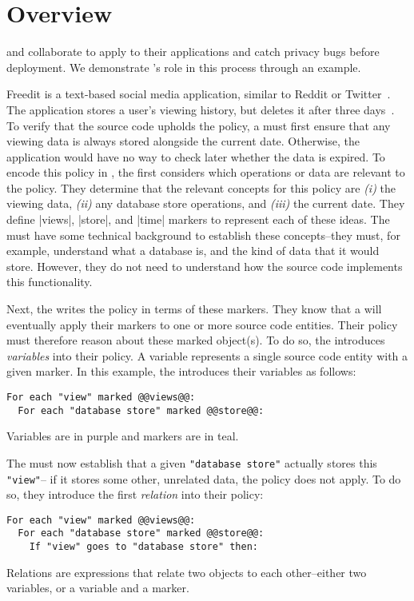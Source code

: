 \chapter{Overview}
\label{sec:overview}

\Ces{} and \devs{} collaborate to apply \sys{} to their applications and catch privacy bugs before deployment.
%
We demonstrate \syslang's role in this process through an example.

Freedit is a text-based social media application, similar to Reddit or Twitter~\cite{freedit}.
%
The application stores a user's viewing history, but deletes it after three days~\cite{freedit-pageviews}.
%
To verify that the source code upholds the policy, 
a \ce{} must first ensure that any viewing data is always stored alongside the current date.
%
Otherwise, the application would have no way to check later whether the data is expired.
%
To encode this policy in \syslang{}, the \ce{} first considers which operations or data are relevant to the policy.
%
They determine that the relevant concepts for this policy are \emph{(i)} the viewing data,
\emph{(ii)} any database store operations, and \emph{(iii)} the current date.
%
They define |views|, |store|, and |time| markers to represent each of these ideas.
%
The \ce{} must have some technical background to establish these concepts--they must, for example, understand what a database is,
and the kind of data that it would store.
%
However, they do not need to understand how the source code implements this functionality.
%

Next, the \ce{} writes the policy in terms of these markers.
%
They know that a \dev{} will eventually apply their markers to one or more source code entities.
%
Their policy must therefore reason about these marked object(s).
%
To do so, the \ce{} introduces \emph{variables} into their policy.
%
A variable represents a single source code entity with a given marker.
%
In this example, the \ce{} introduces their variables as follows:
\begin{lstlisting}[language=CNL]
For each "view" marked @@views@@:
  For each "database store" marked @@store@@:
\end{lstlisting}
%
Variables are in purple and markers are in teal.

The \ce{} must now establish that a given \lstinline[language=CNL]|"database store"| actually stores this \lstinline[language=CNL]|"view"|--
if it stores some other, unrelated data, the policy does not apply.
%
To do so, they introduce the first \emph{relation} into their policy:
\begin{lstlisting}[language=CNL]
For each "view" marked @@views@@:
  For each "database store" marked @@store@@:
    If "view" goes to "database store" then:
\end{lstlisting}
%
Relations are expressions that relate two objects to each other--either two variables, or a variable and a marker.

